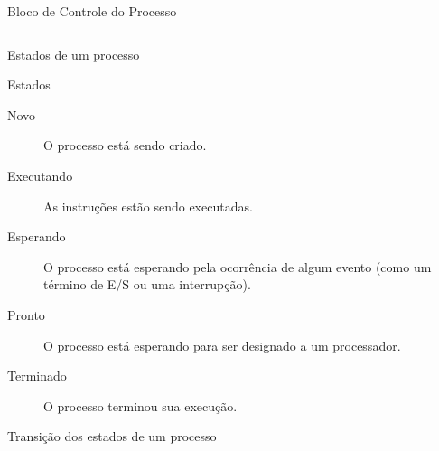 \begin{frame}
\begin{columns}
{\begin{column}{5cm}
\begin{center}

  \scriptsize{Bloco de Controle do Processo}
  
  \smallskip

  
  

\end{center}

\end{column}
} %


\end{columns}

\end{frame}

\begin{frame}{Estados de um processo}
  
\begin{block}{Estados}
  \begin{description}
  \item[Novo] O processo está sendo criado.
  \item[Executando] As instruções estão sendo executadas.
  \item[Esperando] O processo está esperando pela ocorrência de algum
    evento (como um término de E/S ou uma interrupção).
  \item[Pronto] O processo está esperando para ser designado a um processador.
  \item[Terminado] O processo terminou sua execução.
  \end{description}
\end{block}

\end{frame}

\begin{frame}[fragile]{Transição dos estados de um processo}
  
	

\end{frame}

